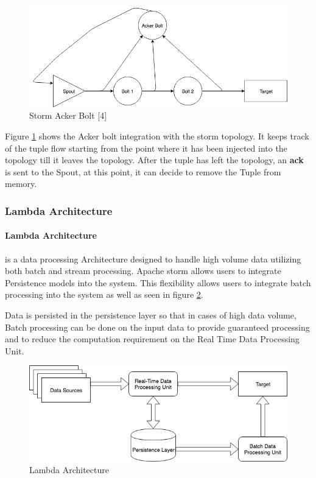 \documentclass[runningheads,a4paper]{llncs}[2015/06/24]
\begin{document}
\begin{figure}
  \begin{center}
    \includegraphics[width=.7\textwidth]{acker.png}
    \caption{Storm Acker Bolt [4]}
    \label{fig:acker}
   \end{center}
\end{figure}

Figure \ref{fig:acker} shows the Acker bolt integration with the storm topology. It keeps track of the tuple flow starting from the point where it has been injected into the topology till it leaves the topology. After the tuple has left the topology, an \textbf{ack} is sent to the Spout, at this point, it can decide to remove the Tuple from memory.

\subsubsection{Lambda Architecture}
\paragraph{Lambda Architecture} is a data processing Architecture designed to handle high volume data utilizing both batch and stream processing. Apache storm allows users to integrate Persistence models into the system. This flexibility allows users to integrate batch processing into the system as well as seen in figure \ref{fig:lambda}.

Data is persisted in the persistence layer so that in cases of high data volume, Batch processing can be done on the input data to provide guaranteed processing and to reduce the computation requirement on the Real Time Data Processing Unit.

\begin{figure}
  \begin{center}
    \includegraphics[width=.7\textwidth]{lambda.png}
    \caption{Lambda Architecture}
    \label{fig:lambda}
   \end{center}
\end{figure}
\end{document}
